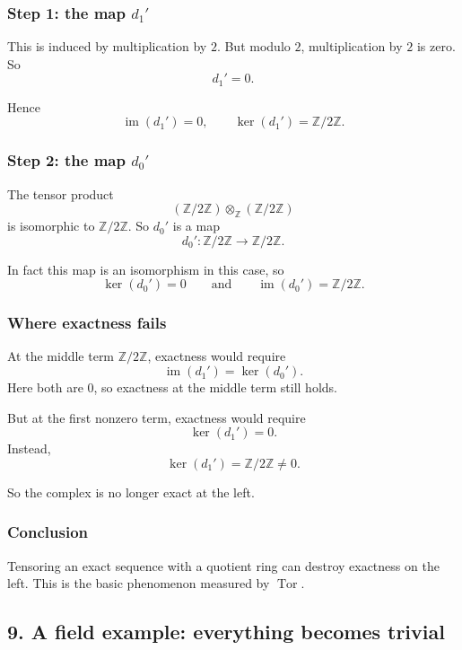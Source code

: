 \documentclass[12pt,a4paper]{article}
\theoremstyle{notespace}
\theoremstyle{definition}
\begin{document}
\subsubsection*{Step 1: the map \(d_1'\)}

This is induced by multiplication by \(2\). But modulo \(2\), multiplication by \(2\) is zero. So
\[
d_1'=0.
\]

Hence
\[
\operatorname{im}(d_1')=0,
\qquad
\ker(d_1')=\mathbb Z/2\mathbb Z.
\]

\subsubsection*{Step 2: the map \(d_0'\)}

The tensor product
\[
(\mathbb Z/2\mathbb Z)\otimes_{\mathbb Z}(\mathbb Z/2\mathbb Z)
\]
is isomorphic to \(\mathbb Z/2\mathbb Z\). So \(d_0'\) is a map
\[
d_0':\mathbb Z/2\mathbb Z \to \mathbb Z/2\mathbb Z.
\]

In fact this map is an isomorphism in this case, so
\[
\ker(d_0')=0
\qquad\text{and}\qquad
\operatorname{im}(d_0')=\mathbb Z/2\mathbb Z.
\]

\subsubsection*{Where exactness fails}

At the middle term \(\mathbb Z/2\mathbb Z\), exactness would require
\[
\operatorname{im}(d_1')=\ker(d_0').
\]
Here both are \(0\), so exactness at the middle term still holds.

But at the first nonzero term, exactness would require
\[
\ker(d_1')=0.
\]
Instead,
\[
\ker(d_1')=\mathbb Z/2\mathbb Z\neq 0.
\]

So the complex is no longer exact at the left.

\subsubsection*{Conclusion}

Tensoring an exact sequence with a quotient ring can destroy exactness on the left.
This is the basic phenomenon measured by \(\operatorname{Tor}\).

\bigskip

\subsection{9. A field example: everything becomes trivial}
\end{document}

